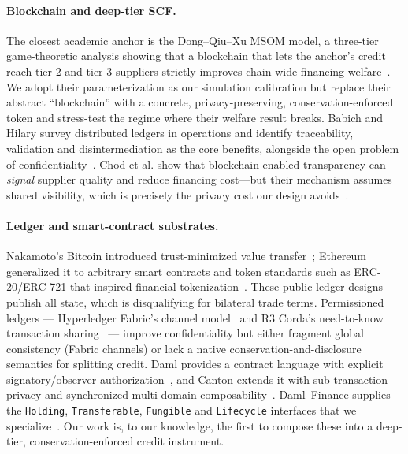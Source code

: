 \documentclass[10pt,twocolumn,letterpaper]{article}
\begin{document}
\paragraph{Blockchain and deep-tier SCF.} The closest academic anchor is the
Dong--Qiu--Xu MSOM model, a three-tier game-theoretic analysis showing that a
blockchain that lets the anchor's credit reach tier-2 and tier-3 suppliers strictly
improves chain-wide financing welfare~\cite{dong2022}. We adopt their parameterization
as our simulation calibration but replace their abstract ``blockchain'' with a
concrete, privacy-preserving, conservation-enforced token and stress-test the regime
where their welfare result breaks. Babich and Hilary survey distributed ledgers in
operations and identify traceability, validation and disintermediation as the core
benefits, alongside the open problem of confidentiality~\cite{babich2020}. Chod et
al. show that blockchain-enabled transparency can \emph{signal} supplier quality and
reduce financing cost---but their mechanism assumes shared visibility, which is
precisely the privacy cost our design avoids~\cite{chod2020}.

\paragraph{Ledger and smart-contract substrates.} Nakamoto's Bitcoin introduced
trust-minimized value transfer~\cite{nakamoto2008}; Ethereum generalized it to
arbitrary smart contracts and token standards such as ERC-20/ERC-721 that inspired
financial tokenization~\cite{buterin2014}. These public-ledger designs publish all
state, which is disqualifying for bilateral trade terms. Permissioned ledgers ---
Hyperledger Fabric's channel model~\cite{androulaki2018} and R3 Corda's
need-to-know transaction sharing~\cite{brown2016} --- improve confidentiality but
either fragment global consistency (Fabric channels) or lack a native
conservation-and-disclosure semantics for splitting credit. Daml provides a
contract language with explicit signatory/observer authorization~\cite{daml2020},
and Canton extends it with sub-transaction privacy and synchronized multi-domain
composability~\cite{canton2020}. Daml~Finance supplies the \texttt{Holding},
\texttt{Transferable}, \texttt{Fungible} and \texttt{Lifecycle} interfaces that we
specialize~\cite{damlfinance2023}. Our work is, to our knowledge, the first to
compose these into a deep-tier, conservation-enforced credit instrument.
\end{document}

